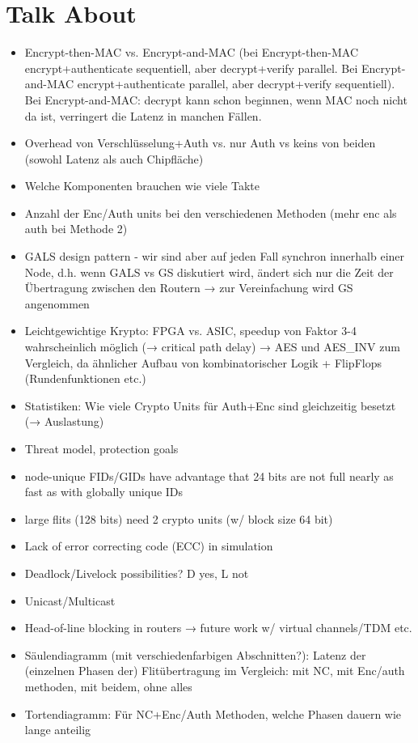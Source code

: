 \documentclass[
	paper=a4,
	fontsize=11pt,
	parskip=full %
]{scrreprt}
\begin{document}
    \chapter{Talk About}
    \begin{itemize}
        \item Encrypt-then-MAC vs. Encrypt-and-MAC (bei Encrypt-then-MAC encrypt+authenticate sequentiell, aber decrypt+verify parallel.
            Bei Encrypt-and-MAC encrypt+authenticate parallel, aber decrypt+verify sequentiell). Bei Encrypt-and-MAC: decrypt kann schon
            beginnen, wenn MAC noch nicht da ist, verringert die Latenz in manchen Fällen.
        \item Overhead von Verschlüsselung+Auth vs. nur Auth vs keins von beiden (sowohl Latenz als auch Chipfläche)
        \item Welche Komponenten brauchen wie viele Takte
        \item Anzahl der Enc/Auth units bei den verschiedenen Methoden (mehr enc als auth bei Methode 2)
        \item GALS design pattern - wir sind aber auf jeden Fall synchron innerhalb einer Node, d.h. wenn GALS vs GS diskutiert wird,
            ändert sich nur die Zeit der Übertragung zwischen den Routern → zur Vereinfachung wird GS angenommen
        \item Leichtgewichtige Krypto: FPGA vs. ASIC, speedup von Faktor 3-4 wahrscheinlich möglich (→ critical path delay) \cite{kuon07fpgavsasic}
            → AES und AES\_INV zum Vergleich, da ähnlicher Aufbau von kombinatorischer Logik + FlipFlops (Rundenfunktionen etc.)
        \item Statistiken: Wie viele Crypto Units für Auth+Enc sind gleichzeitig besetzt (→ Auslastung)
        \item Threat model, protection goals
        \item node-unique FIDs/GIDs have advantage that 24 bits are not full nearly as fast as with globally unique IDs
		\item large flits (128 bits) need 2 crypto units (w/ block size 64 bit)
        \item Lack of error correcting code (ECC) in simulation
        \item Deadlock/Livelock possibilities? D yes, L not
        \item Unicast/Multicast
        \item Head-of-line blocking in routers → future work w/ virtual channels/TDM etc.
        \item Säulendiagramm (mit verschiedenfarbigen Abschnitten?): Latenz der (einzelnen Phasen der) Flitübertragung im Vergleich: mit NC, mit
            Enc/auth methoden, mit beidem, ohne alles
        \item Tortendiagramm: Für NC+Enc/Auth Methoden, welche Phasen dauern wie lange anteilig
    \end{itemize}
\end{document}
